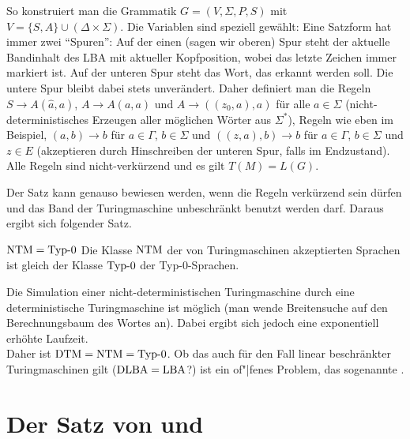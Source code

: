 \begin{Beweis}
    So konstruiert man die Grammatik $G = (V, \Sigma, P, S)$ mit
    $V = \{S, A\} \cup (\Delta \times \Sigma)$.
    Die Variablen sind speziell gewählt:
    Eine Satzform hat immer zwei "`Spuren"':
    Auf der einen (sagen wir oberen) Spur steht der aktuelle Bandinhalt des
    LBA mit aktueller Kopfposition, wobei das letzte Zeichen immer markiert
    ist.
    Auf der unteren Spur steht das Wort, das erkannt werden soll.
    Die untere Spur bleibt dabei stets unverändert.
    Daher definiert man die Regeln $S \rightarrow A (\widehat{a}, a)$,
    $A \rightarrow A (a, a)$ und
    $A \rightarrow ((z_0, a), a)$ für alle $a \in \Sigma$
    (nicht-deterministisches Erzeugen aller
    möglichen Wörter aus $\Sigma^\ast$),
    Regeln wie eben im Beispiel,
    $(a, b) \rightarrow b$ für $a \in \Gamma$, $b \in \Sigma$ und
    $((z, a), b) \rightarrow b$ für $a \in \Gamma$, $b \in \Sigma$ und
    $z \in E$
    (akzeptieren durch Hinschreiben der unteren Spur, falls im Endzustand).\\
    Alle Regeln sind nicht-verkürzend und es gilt $T(M) = L(G)$.
\end{Beweis}

\linie
\pagebreak

\begin{Bem}
    Der Satz kann genauso bewiesen werden, wenn die Regeln verkürzend sein
    dürfen und das Band der Turingmaschine unbeschränkt benutzt werden darf.
    Daraus ergibt sich folgender Satz.
\end{Bem}

\begin{Satz}{$\text{NTM} = \text{Typ-0}$}
    Die Klasse $\text{NTM}$ der von Turingmaschinen akzeptierten Sprachen
    ist gleich der Klasse $\text{Typ-0}$ der Typ-0-Sprachen.
\end{Satz}

\begin{Bem}
    Die Simulation einer nicht-deterministischen Turingmaschine durch
    eine deterministische Turingmaschine ist möglich
    (man wende Breitensuche auf den Berechnungsbaum des Wortes an).
    Dabei ergibt sich jedoch eine exponentiell erhöhte Laufzeit.\\
    Daher ist $\text{DTM} = \text{NTM} = \text{Typ-0}$.
    Ob das auch für den Fall linear beschränkter Turingmaschinen gilt
    ($\text{DLBA} = \text{LBA}$?) ist ein of"|fenes Problem, das sogenannte
    .
\end{Bem}

\section{%
    Der Satz von  und %
}

